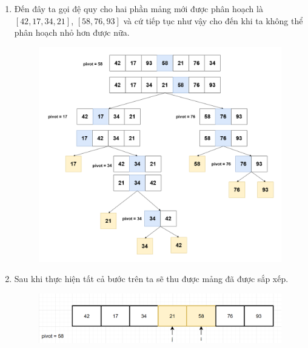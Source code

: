 \begin{enumerate}
    \item Đến đây ta gọi đệ quy cho hai phần mảng mới được phân hoạch là $[42, 17, 34, 21]$, $[58, 76, 93]$ và cứ tiếp tục như vậy cho đến khi ta không thể phân hoạch nhỏ hơn được nữa.
    \begin{figure}[H]
        \centering
        \includegraphics[width=1\linewidth]{img/quick_sort/9.png}
        
    \end{figure}

    \item Sau khi thực hiện tất cả bước trên ta sẽ thu được mảng đã được sắp xếp.
    \begin{figure}[H]
        \centering
        \includegraphics[width=0.75\linewidth]{img/quick_sort/10.png}
    \end{figure}
\end{enumerate}

